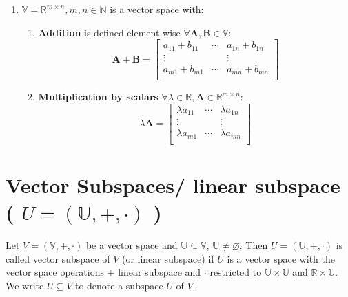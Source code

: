 \begin{enumerate}
\begin{enumerate}
    \end{enumerate}

    \item $\mathbb{V} = \mathbb{R}^{m\times n}, m, n \in \mathbb{N}$ is a vector space with:
    \begin{enumerate}
        \item \textbf{Addition} is defined element-wise $\forall \mathbf{A, B} \in \mathbb{V}$: 
        \[
            \mathbf{A + B} = \begin{bmatrix}
                a_{11} + b_{11} & \cdots & a_{1n} + b_{1n} \\
                \vdots & & \vdots \\
                a_{m1} + b_{m1} & \cdots & a_{mn} + b_{mn} \\
            \end{bmatrix}
        \]

        \item \textbf{Multiplication by scalars} $\forall \lambda\in\mathbb{R}, \mathbf{A}\in\mathbb{R}^{m\times n}$:
        \[
            \lambda\mathbf{A} = \begin{bmatrix}
                \lambda a_{11} & \cdots & \lambda a_{1n} \\
                \vdots & & \vdots \\
                \lambda a_{m1} & \cdots & \lambda a_{mn} \\
            \end{bmatrix}
        \]
    \end{enumerate}


\end{enumerate}













\section{Vector Subspaces/ linear subspace ( $U = (\mathbb{U}, +, \cdot)$ ) \cite{mfml-1}}\label{Vector Subspaces/ linear subspace}
Let $V = (\mathbb{V}, +, \cdot)$ be a vector space and $\mathbb{U} \subseteq \mathbb{V}$, $\mathbb{U} \neq \varnothing$. Then $U = (\mathbb{U}, +, \cdot)$ is called vector subspace of $V$ (or linear subspace) if $U$ is a vector space with the vector space operations $+$ linear subspace and $\cdot$ restricted to $\mathbb{U} \times \mathbb{U}$ and $\mathbb{R} \times \mathbb{U}$. We write $U \subseteq V$ to denote a subspace $U$ of $V$.

